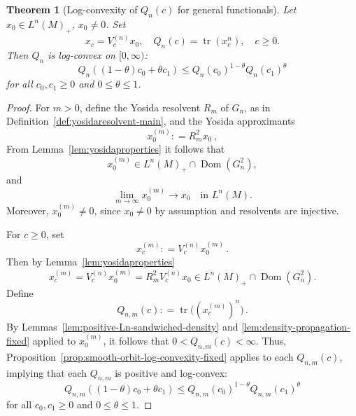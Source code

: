 \documentclass[11pt,a4paper]{article}
\theoremstyle{plain}
\newtheorem{theorem}{Theorem}
\numberwithin{theorem}{section}
\theoremstyle{definition}
\newcommand{\?}{\overset{?}{=}}
\newcommand{\defeq}{\mathrel{\mathop:}=}
\DeclareMathOperator{\tr}{tr}
\newcommand{\I}{\infty}
\DeclareMathOperator{\Dom}{Dom}
\begin{document}
\begin{theorem}[Log-convexity of $Q_n(c)$ for general functionals]
\label{thm:general-log-convexity}
Let $x_0\in L^n(M)_+$, $x_0\neq0$.
Set
\[
    x_c=V_c^{(n)}x_0, \quad Q_n(c)=\tr(x_c^n), \quad c\geq0.
\]
Then $Q_n$ is log-convex on $[0,\infty)$:
\begin{equation}
    Q_n((1-\theta)c_0+\theta c_1)
  \leq Q_n(c_0)^{1-\theta}Q_n(c_1)^\theta
\end{equation}
for all $c_0,c_1\geq 0$ and $0\leq \theta\leq 1$.
\end{theorem}
\begin{proof}
For $m>0$, define the Yosida resolvent $R_m$ of $G_n$, as in Definition~\ref{def:yosidaresolvent-main}, and the Yosida approximants 
\begin{equation*}
  x_0^{(m)} \defeq R_m^2x_0\,,
\end{equation*}
From Lemma~\ref{lem:yosidaproperties} it follows that 
\begin{equation*}
  x_0^{(m)}\in L^n(M)_+\cap\Dom(G_n^2),
\end{equation*}
and
\begin{equation}
 \lim_{m\to \I} x_0^{(m)}\to x_0
  \quad
  \text{in }L^n(M).
\end{equation}
Moreover, $x_0^{(m)}\neq 0$, since $x_0\neq0$ by assumption and resolvents are injective.

For $c\geq 0$, set
\begin{equation*}
  x_c^{(m)} \defeq V_c^{(n)}x_0^{(m)}\,.
\end{equation*}
Then by Lemma~\ref{lem:yosidaproperties}
\begin{equation*}
    x_c^{(m)}=V_c^{(n)}x_0^{(m)}=R_m^2 V_c^{(n)}x_0\in L^n(M)_+\cap\Dom(G_n^2).
\end{equation*}
Define
\begin{equation*}
  Q_{n,m}(c) \defeq \tr\bigl((x_c^{(m)})^n\bigr)\,.
\end{equation*}
By Lemmas~\ref{lem:positive-Ln-sandwiched-density} and \ref{lem:density-propagation-fixed} applied to $x_0^{(m)}$, it follows that $ 0<Q_{n,m}(c)<\I$. 
Thus, Proposition~\ref{prop:smooth-orbit-log-convexity-fixed} applies to each $Q_{n,m}(c)$, implying that each $Q_{n,m}$ is positive and log-convex:
\begin{equation*}
  Q_{n,m}((1-\theta)c_0+\theta c_1)
  \leq Q_{n,m}(c_0)^{1-\theta}Q_{n,m}(c_1)^\theta
\end{equation*}
for all $c_0,c_1\geq 0$ and $0\leq\theta\leq 1$.


\end{proof}
\end{document}
